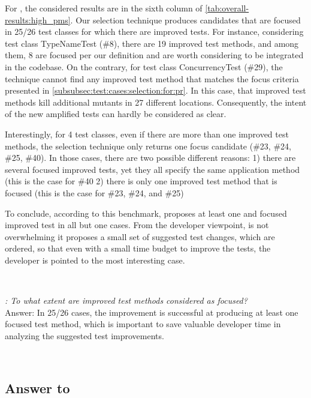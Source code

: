 For \rqcandidates{}, the considered results are in the sixth column of \autoref{tab:overall-results:high_pms}. Our selection technique produces candidates that are focused in 25/26 test classes for which there are improved tests. 
For instance, considering test class TypeNameTest (\#8), there are 19 improved test methods, and among them, 8 are focused per our definition and are worth considering to be integrated in the codebase.
On the contrary, for test class ConcurrencyTest (\#29), the technique cannot find any improved test method that matches the focus criteria presented in \autoref{subsubsec:test:cases:selection:for:pr}. In this case, that improved test methods kill additional mutants in 27 different locations. Consequently, the intent of the new amplified tests can  hardly be considered as clear.

Interestingly, for 4 test classes, even if there are more than one improved test methods, the selection technique only  returns one focus candidate (\#23, \#24, \#25, \#40). 
In those cases, there are two possible different reasons:
1) there are several focused improved tests, yet they all specify the same application method (this is the case for \#40
2) there is only one improved test method that is focused (this is the case for \#23, \#24, and \#25)

To conclude, according to this benchmark, \dspot{} proposes at least one and focused improved test in all but one cases. From the developer viewpoint, \dspot is not overwhelming it proposes a small set of suggested test changes, which are ordered, so that even with a small time budget to improve the tests, the developer is pointed to the most interesting case.

~\\
\begin{mdframed}
	\textit{\rqcandidates{}:  To what extent are improved test methods considered as focused?}\\
	Answer: In 25/26 cases, the improvement is successful at producing at least one focused test method, which is important to save valuable developer time in analyzing the suggested test improvements.
\end{mdframed}
~\\



\subsection{Answer to \rqeffectiveness}

